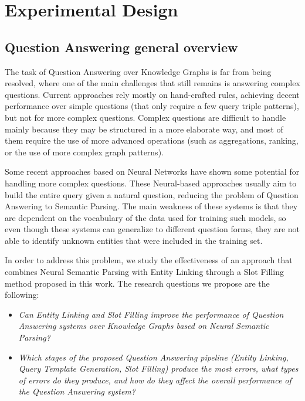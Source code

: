 \chapter{Experimental Design}
\label{cap4:experimentalDesign}

\section{Question Answering general overview}
\label{cap4:experimentalDesign/QaOverview}
The task of Question Answering over Knowledge Graphs is far from being resolved, where one of 
the main challenges that still remains is answering complex questions. Current approaches rely 
mostly on hand-crafted rules, achieving decent performance over simple questions (that only 
require a few query triple patterns), but not for more complex questions. Complex questions are 
difficult to handle mainly because they may be structured in a more elaborate way, and most of 
them require the use of more advanced \SPARQL{} operations (such as aggregations, ranking, or the 
use of more complex graph patterns).

Some recent approaches based on Neural Networks have shown some potential for handling more 
complex questions. These Neural-based approaches usually aim to build the entire \SPARQL{} query 
given a natural question, reducing the problem of Question Answering to Semantic Parsing. The 
main weakness of these systems is that they are dependent on the vocabulary of the data used 
for training such models, so even though these systems can generalize to different question 
forms, they are not able to identify unknown entities that were included in the training set.

In order to address this problem, we study the effectiveness of an approach that combines Neural 
Semantic Parsing with Entity Linking through a Slot Filling method proposed in this work. The 
research questions we propose are the following:

\begin{itemize}
    \item \textit{Can Entity Linking and Slot Filling improve the performance of Question 
    Answering systems over Knowledge Graphs based on Neural Semantic Parsing?}
    \item \textit{Which stages of the proposed Question Answering pipeline (Entity Linking, 
    Query Template Generation, Slot Filling) produce the most errors, what types of errors do 
    they produce, and how do they affect the overall performance of the Question Answering system?}
\end{itemize}

